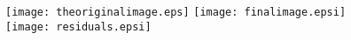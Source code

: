 \documentclass[11pt,epsf]{article}
\begin{document}
\rm


\newcommand{\x}{{\bf{x}}}
\newcommand{\xp}{{{\bf x}_p}}
\newcommand{\xpi}{{{\bf x}_p^i}}
\newcommand{\bu}{{\bf{u}}}
\newcommand{\arcsper}{\ifmmode \rlap.{'' }\else $\rlap{.}'' $\fi}
\newcommand{\arcs}{\ifmmode {'' }\else $'' $\fi}
\newcommand{\arcm}{\ifmmode {' }\else $' $\fi}

\normalsize
\rm


\begin{figure}[h]
\begin{center}
\vbox{
  \texttt{[image: theoriginalimage.eps]}
  \texttt{[image: finalimage.epsi]}
  \texttt{[image: residuals.epsi]}
}
\label{PSF_DECOMP}
\end{center}
\end{figure}
\end{document}
